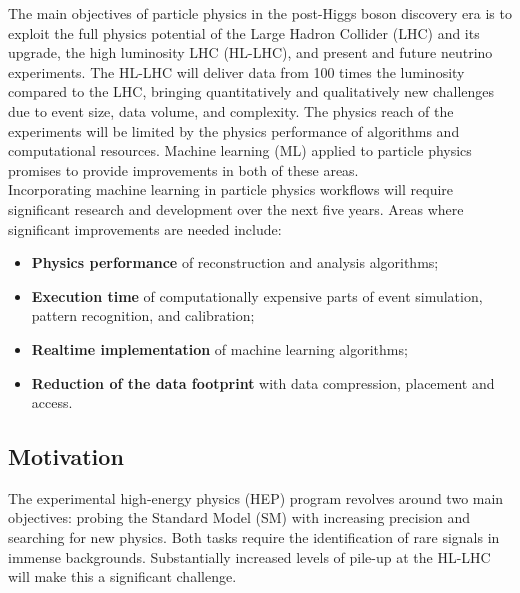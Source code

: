

The main objectives of particle physics in the post-Higgs boson discovery era is to exploit the full physics potential of the Large Hadron Collider (LHC) and its upgrade, the high luminosity LHC (HL-LHC), and present and future neutrino experiments.
The HL-LHC will deliver data from 100 times the luminosity compared to the LHC, bringing quantitatively and qualitatively new challenges due to event size, data volume, and complexity. The physics reach of the experiments will be limited by the physics performance of algorithms and computational resources. Machine learning (ML) applied to particle physics promises to provide improvements in both of these areas.\\

Incorporating machine learning in particle physics workflows will require significant research and development over the next five years. Areas where significant improvements are needed include:
\begin{itemize}
 \item \textbf{Physics performance} of reconstruction and analysis algorithms;
 \item \textbf{Execution time} of computationally expensive parts of event simulation, pattern recognition, and calibration;
 \item \textbf{Realtime implementation} of machine learning algorithms;
 \item \textbf{Reduction of the data footprint} with data compression, placement and access.
\end{itemize}
\noindent

\subsection{Motivation}
The experimental high-energy physics (HEP) program revolves around two main objectives: probing the Standard Model (SM) with increasing precision and searching for new physics. Both tasks require the identification of rare signals in immense backgrounds. Substantially increased levels of pile-up at the HL-LHC will make this a significant challenge.\\

